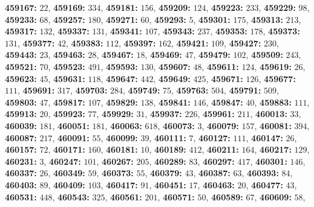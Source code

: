 \textsf{\bfseries 459167:} $22$, \textsf{\bfseries 459169:} $334$, \textsf{\bfseries 459181:} $156$, \textsf{\bfseries 459209:} $124$, \textsf{\bfseries 459223:} $233$, \textsf{\bfseries 459229:} $98$, \textsf{\bfseries 459233:} $68$, \textsf{\bfseries 459257:} $180$, \textsf{\bfseries 459271:} $60$, \textsf{\bfseries 459293:} $5$, \textsf{\bfseries 459301:} $175$, \textsf{\bfseries 459313:} $213$, \textsf{\bfseries 459317:} $132$, \textsf{\bfseries 459337:} $131$, \textsf{\bfseries 459341:} $107$, \textsf{\bfseries 459343:} $237$, \textsf{\bfseries 459353:} $178$, \textsf{\bfseries 459373:} $131$, \textsf{\bfseries 459377:} $42$, \textsf{\bfseries 459383:} $112$, \textsf{\bfseries 459397:} $162$, \textsf{\bfseries 459421:} $109$, \textsf{\bfseries 459427:} $230$, \textsf{\bfseries 459443:} $23$, \textsf{\bfseries 459463:} $28$, \textsf{\bfseries 459467:} $18$, \textsf{\bfseries 459469:} $47$, \textsf{\bfseries 459479:} $102$, \textsf{\bfseries 459509:} $243$, \textsf{\bfseries 459521:} $70$, \textsf{\bfseries 459523:} $491$, \textsf{\bfseries 459593:} $130$, \textsf{\bfseries 459607:} $48$, \textsf{\bfseries 459611:} $124$, \textsf{\bfseries 459619:} $26$, \textsf{\bfseries 459623:} $45$, \textsf{\bfseries 459631:} $118$, \textsf{\bfseries 459647:} $442$, \textsf{\bfseries 459649:} $425$, \textsf{\bfseries 459671:} $126$, \textsf{\bfseries 459677:} $111$, \textsf{\bfseries 459691:} $317$, \textsf{\bfseries 459703:} $284$, \textsf{\bfseries 459749:} $75$, \textsf{\bfseries 459763:} $504$, \textsf{\bfseries 459791:} $509$, \textsf{\bfseries 459803:} $47$, \textsf{\bfseries 459817:} $107$, \textsf{\bfseries 459829:} $138$, \textsf{\bfseries 459841:} $146$, \textsf{\bfseries 459847:} $40$, \textsf{\bfseries 459883:} $111$, \textsf{\bfseries 459913:} $20$, \textsf{\bfseries 459923:} $77$, \textsf{\bfseries 459929:} $31$, \textsf{\bfseries 459937:} $226$, \textsf{\bfseries 459961:} $211$, \textsf{\bfseries 460013:} $33$, \textsf{\bfseries 460039:} $181$, \textsf{\bfseries 460051:} $181$, \textsf{\bfseries 460063:} $618$, \textsf{\bfseries 460073:} $3$, \textsf{\bfseries 460079:} $157$, \textsf{\bfseries 460081:} $394$, \textsf{\bfseries 460087:} $217$, \textsf{\bfseries 460091:} $55$, \textsf{\bfseries 460099:} $39$, \textsf{\bfseries 460111:} $7$, \textsf{\bfseries 460127:} $111$, \textsf{\bfseries 460147:} $26$, \textsf{\bfseries 460157:} $72$, \textsf{\bfseries 460171:} $160$, \textsf{\bfseries 460181:} $10$, \textsf{\bfseries 460189:} $412$, \textsf{\bfseries 460211:} $164$, \textsf{\bfseries 460217:} $129$, \textsf{\bfseries 460231:} $3$, \textsf{\bfseries 460247:} $101$, \textsf{\bfseries 460267:} $205$, \textsf{\bfseries 460289:} $83$, \textsf{\bfseries 460297:} $417$, \textsf{\bfseries 460301:} $146$, \textsf{\bfseries 460337:} $26$, \textsf{\bfseries 460349:} $59$, \textsf{\bfseries 460373:} $55$, \textsf{\bfseries 460379:} $43$, \textsf{\bfseries 460387:} $63$, \textsf{\bfseries 460393:} $84$, \textsf{\bfseries 460403:} $89$, \textsf{\bfseries 460409:} $103$, \textsf{\bfseries 460417:} $91$, \textsf{\bfseries 460451:} $17$, \textsf{\bfseries 460463:} $20$, \textsf{\bfseries 460477:} $43$, \textsf{\bfseries 460531:} $448$, \textsf{\bfseries 460543:} $325$, \textsf{\bfseries 460561:} $201$, \textsf{\bfseries 460571:} $50$, \textsf{\bfseries 460589:} $67$, \textsf{\bfseries 460609:} $58$, 
